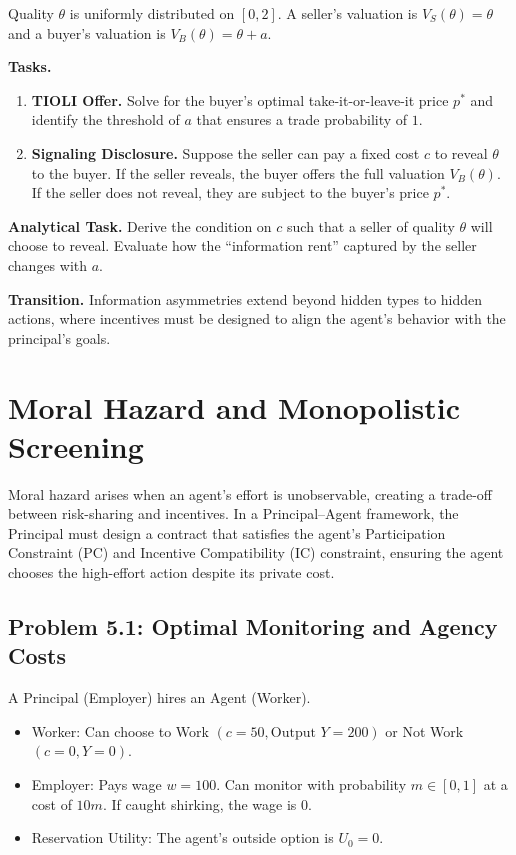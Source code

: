 \documentclass[12pt,a4paper]{article}
\begin{document}
Quality \(\theta\) is uniformly distributed on \([0, 2]\). A seller's valuation is
\(
  V_S(\theta) = \theta
\)
and a buyer's valuation is
\(
  V_B(\theta) = \theta + a
\).

\noindent\textbf{Tasks.}
\begin{enumerate}
  \item \textbf{TIOLI Offer.} Solve for the buyer's optimal take-it-or-leave-it price \(p^*\) and identify the threshold of \(a\) that ensures a trade probability of \(1\).
  \item \textbf{Signaling Disclosure.} Suppose the seller can pay a fixed cost \(c\) to reveal \(\theta\) to the buyer. If the seller reveals, the buyer offers the full valuation \(V_B(\theta)\). If the seller does not reveal, they are subject to the buyer's price \(p^*\).
\end{enumerate}

\noindent\textbf{Analytical Task.} Derive the condition on \(c\) such that a seller of quality \(\theta\) will choose to reveal. Evaluate how the ``information rent'' captured by the seller changes with \(a\).

\bigskip
\noindent\textbf{Transition.} Information asymmetries extend beyond hidden types to hidden actions, where incentives must be designed to align the agent's behavior with the principal's goals.

\section{Moral Hazard and Monopolistic Screening}

Moral hazard arises when an agent's effort is unobservable, creating a trade-off between risk-sharing and incentives. In a Principal--Agent framework, the Principal must design a contract that satisfies the agent's Participation Constraint (PC) and Incentive Compatibility (IC) constraint, ensuring the agent chooses the high-effort action despite its private cost.

\subsection*{Problem 5.1: Optimal Monitoring and Agency Costs}

A Principal (Employer) hires an Agent (Worker).
\begin{itemize}
  \item Worker: Can choose to Work \((c = 50, \text{Output } Y = 200)\) or Not Work \((c = 0, Y = 0)\).
  \item Employer: Pays wage \(w = 100\). Can monitor with probability \(m \in [0,1]\) at a cost of \(10m\). If caught shirking, the wage is \(0\).
  \item Reservation Utility: The agent's outside option is \(U_0 = 0\).
\end{itemize}
\end{document}
